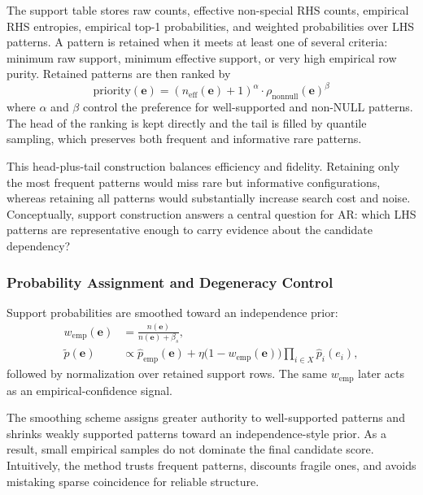 \documentclass[conference]{IEEEtran}
\begin{document}
The support table stores raw counts, effective non-special RHS counts, empirical RHS entropies, empirical top-1 probabilities, and weighted probabilities over LHS patterns. A pattern is retained when it meets at least one of several criteria: minimum raw support, minimum effective support, or very high empirical row purity. Retained patterns are then ranked by
\begin{equation}
    \mathrm{priority}(\mathbf{e}) = (n_{\mathrm{eff}}(\mathbf{e})+1)^\alpha \cdot \rho_{\mathrm{nonnull}}(\mathbf{e})^\beta
\end{equation}
where $\alpha$ and $\beta$ control the preference for well-supported and non-NULL patterns. The head of the ranking is kept directly and the tail is filled by quantile sampling, which preserves both frequent and informative rare patterns.

This head-plus-tail construction balances efficiency and fidelity. Retaining only the most frequent patterns would miss rare but informative configurations, whereas retaining all patterns would substantially increase search cost and noise. Conceptually, support construction answers a central question for AR: which LHS patterns are representative enough to carry evidence about the candidate dependency?

\subsubsection{Probability Assignment and Degeneracy Control}

Support probabilities are smoothed toward an independence prior:
\begin{align}
    w_{\mathrm{emp}}(\mathbf{e}) &= \frac{n(\mathbf{e})}{n(\mathbf{e})+\beta_s}, \\
    \tilde{p}(\mathbf{e}) &\propto \hat{p}_{\mathrm{emp}}(\mathbf{e}) + \eta \bigl(1-w_{\mathrm{emp}}(\mathbf{e})\bigr)\prod_{i\in X}\hat{p}_i(e_i),
\end{align}
followed by normalization over retained support rows. The same $w_{\mathrm{emp}}$ later acts as an empirical-confidence signal.

The smoothing scheme assigns greater authority to well-supported patterns and shrinks weakly supported patterns toward an independence-style prior. As a result, small empirical samples do not dominate the final candidate score. Intuitively, the method trusts frequent patterns, discounts fragile ones, and avoids mistaking sparse coincidence for reliable structure.
\end{document}
